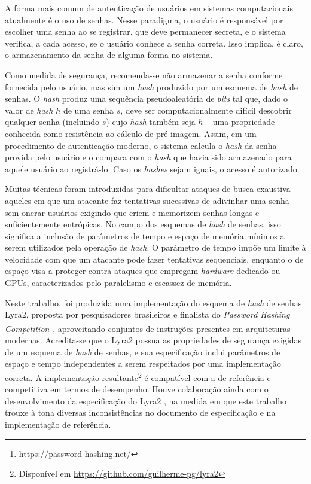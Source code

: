 \documentclass{article}
\begin{document}
A forma mais comum de autenticação de usuários em sistemas
computacionais atualmente é o uso de senhas. Nesse paradigma, o usuário
é responsável por escolher uma senha ao se registrar, que deve
permanecer secreta, e o sistema verifica, a cada acesso, se o usuário
conhece a senha correta. Isso implica, é claro, o armazenamento da senha
de alguma forma no sistema.

Como medida de segurança, recomenda-se não armazenar a senha conforme
fornecida pelo usuário, mas sim um \emph{hash} produzido por um esquema
de \emph{hash} de senhas. O \emph{hash} produz uma sequência pseudoaleatória
de \emph{bits} tal que, dado o valor de \emph{hash} $h$ de uma senha
$s$, deve ser computacionalmente difícil descobrir qualquer senha
(incluindo $s$) cujo \emph{hash} também seja $h$ -- uma propriedade
conhecida como resistência ao cálculo de pré-imagem.
Assim, em um procedimento de autenticação moderno, o sistema calcula o
\emph{hash} da senha provida pelo usuário e o compara com o \emph{hash}
que havia sido armazenado para aquele usuário ao registrá-lo. Caso os
\emph{hashes} sejam iguais, o acesso é autorizado.

Muitas técnicas foram introduzidas para dificultar
ataques de busca exaustiva -- aqueles em que um atacante faz tentativas
sucessivas de adivinhar uma senha -- sem onerar usuários exigindo que
criem e memorizem senhas longas e suficientemente entrópicas.
No campo dos esquemas de \emph{hash} de senhas, isso significa a inclusão
de parâmetros de tempo e espaço de memória mínimos a serem utilizados
pela operação de \emph{hash}. O parâmetro de tempo impõe um limite à
velocidade com que um atacante pode fazer tentativas sequenciais,
enquanto o de espaço visa a proteger contra ataques que empregam \emph{hardware}
dedicado ou GPUs, caracterizados pelo paralelismo e escassez de memória.

Neste trabalho, foi produzida uma implementação do
esquema de \emph{hash} de senhas Lyra2, proposta por pesquisadores
brasileiros e finalista do \emph{Password Hashing Competition}\footnote{\url{https://password-hashing.net/}}, aproveitando
conjuntos de instruções presentes em arquiteturas modernas. Acredita-se
que o Lyra2 possua as propriedades de segurança exigidas de um esquema
de \emph{hash} de senhas, e sua especificação inclui parâmetros de espaço e tempo
independentes a serem respeitados por uma implementação correta.
A implementação resultante\footnote{Disponível em \url{https://github.com/guilherme-pg/lyra2}}
é compatível com a de referência e competitiva em termos de desempenho. Houve colaboração
ainda com o desenvolvimento da especificação do Lyra2 \cite{lyra2-spec},
na medida em que este trabalho trouxe à tona diversas
inconsistências no documento de especificação e na implementação de referência.
\end{document}

